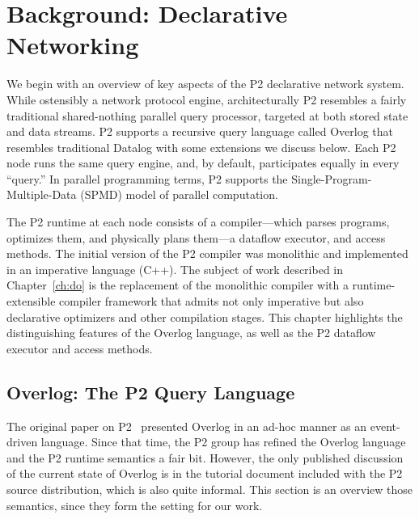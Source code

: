 \chapter[Background: Declarative Networking]{Background: Declarative Networking}
\label{ch:p2}

We begin with an overview of key aspects of the P2 declarative network system. While ostensibly a network protocol 
engine, architecturally P2 resembles a fairly traditional shared-nothing parallel query processor, targeted at both stored 
state and data streams.  P2 supports a recursive query language called Overlog that resembles traditional Datalog with 
some extensions we discuss below.  Each P2 node runs the same query engine, and, by default, participates equally 
in every ``query.''   In parallel programming terms, P2 supports the  Single-Program-Multiple-Data (SPMD) model of 
parallel computation.

The P2 runtime at each node consists of a compiler---which parses programs,
optimizes them, and physically plans them---a dataflow executor, and access methods.  
The initial version of the P2 compiler was monolithic and implemented in an imperative language (C++). 
The subject of work described in Chapter~\ref{ch:do} is the replacement of the monolithic compiler with a
runtime-extensible compiler framework that admits not only imperative
but also declarative optimizers and other compilation stages.  This chapter highlights the distinguishing 
features of the Overlog language, as well as the P2 dataflow executor and access methods. 

\section{Overlog: The P2 Query Language}
\label{ch:p2:sec:overlog}
The original paper on P2~\cite{p2:sosp} presented Overlog in an ad-hoc manner as an event-driven language. Since that time, the P2 group has refined the Overlog language and the P2 runtime semantics a fair bit.  However, the only published discussion of the current state of Overlog is in the tutorial document included with the P2 source distribution, which is also quite informal. This section is an overview those
semantics, since they form the setting for our work. 

